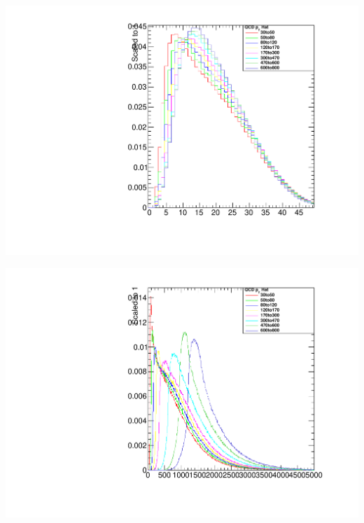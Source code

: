 \documentclass[a4paper]{article}
\begin{document}
\begin{minipage}{.5\textwidth}
  \centering
  \includegraphics[width=1.0\linewidth]{img/Jets_Multiplicity.pdf}
\end{minipage}%
\begin{minipage}{0.5\textwidth}
  \centering
  \includegraphics[width=1.0\linewidth]{img/Dijet_MaxMjj.pdf}
\end{minipage}
\end{document}
